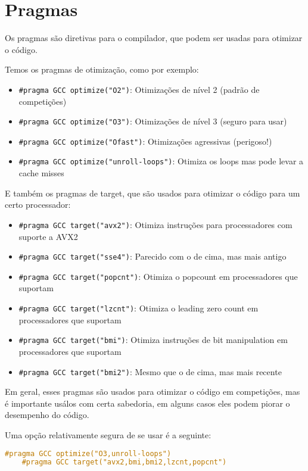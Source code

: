 \documentclass[10pt, a4paper, oneside]{book}
\begin{document}
\section{Pragmas}

Os pragmas são diretivas para o compilador, que podem ser usadas para otimizar o código.

Temos os pragmas de otimização, como por exemplo:

\begin{itemize}
    \item \texttt{\#pragma GCC optimize("O2")}: Otimizações de nível 2 (padrão de competições)
    \item \texttt{\#pragma GCC optimize("O3")}: Otimizações de nível 3 (seguro para usar)
    \item \texttt{\#pragma GCC optimize("Ofast")}: Otimizações agressivas (perigoso!)
    \item \texttt{\#pragma GCC optimize("unroll-loops")}: Otimiza os loops mas pode levar a cache misses
\end{itemize}

E também os pragmas de target, que são usados para otimizar o código para um certo processador:

\begin{itemize}
    \item \texttt{\#pragma GCC target("avx2")}: Otimiza instruções para processadores com suporte a AVX2
    \item \texttt{\#pragma GCC target("sse4")}: Parecido com o de cima, mas mais antigo
    \item \texttt{\#pragma GCC target("popcnt")}: Otimiza o popcount em processadores que suportam
    \item \texttt{\#pragma GCC target("lzcnt")}: Otimiza o leading zero count em processadores que suportam
    \item \texttt{\#pragma GCC target("bmi")}: Otimiza instruções de bit manipulation em processadores que suportam
    \item \texttt{\#pragma GCC target("bmi2")}: Mesmo que o de cima, mas mais recente
\end{itemize}

Em geral, esses pragmas são usados para otimizar o código em competições, mas é importante usálos com certa sabedoria, em alguns casos eles podem piorar o desempenho do código.

Uma opção relativamente segura de se usar é a seguinte:

\begin{lstlisting}[language=C++]
    #pragma GCC optimize("O3,unroll-loops")
    #pragma GCC target("avx2,bmi,bmi2,lzcnt,popcnt")
\end{lstlisting}
\end{document}
